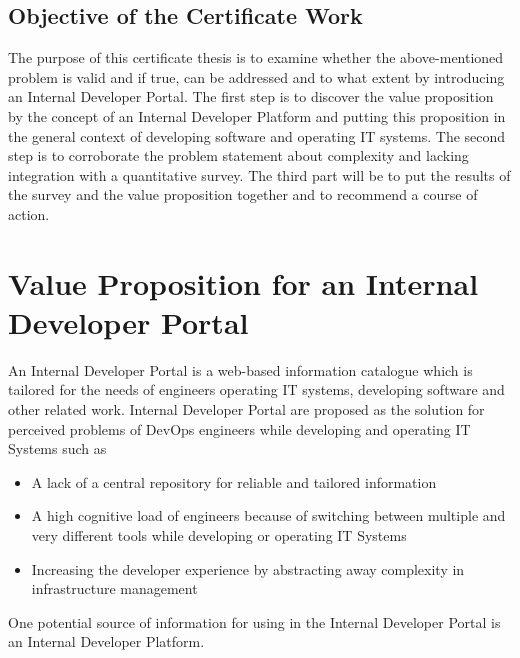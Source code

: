\documentclass[a4paper,12pt]{article}
\begin{document}
    \subsection{Objective of the Certificate Work}
    \label{subsec:iobjective}
    The purpose of this certificate thesis is to examine whether the above-mentioned problem is valid and if true,
    can be addressed and to what extent by introducing an Internal Developer Portal.
    The first step is to discover the value proposition by the concept of an Internal Developer Platform and putting this
    proposition in the general context of developing software and operating IT systems.
    The second step is to corroborate the problem statement about complexity and lacking integration with a quantitative
    survey.
    The third part will be to put the results of the survey and the value proposition together and to recommend a course
    of action.


    \section{Value Proposition for an Internal Developer Portal}
    \label{sec:vp}
    An Internal Developer Portal is a web-based information catalogue which is tailored for the needs of
    engineers operating IT systems, developing software and other related work.
    Internal Developer Portal are proposed as the solution for perceived problems\parencite{backstagestory} of DevOps
    engineers while developing and operating IT Systems such as
    \begin{itemize}
        \item A lack of a central repository for reliable and tailored information
        \item A high cognitive load of engineers because of switching between multiple and very different tools while developing or operating IT Systems
        \item Increasing the developer experience by abstracting away complexity in infrastructure management
    \end{itemize}
    One potential source of information for using in the Internal Developer Portal is an Internal Developer Platform.
\end{document}
